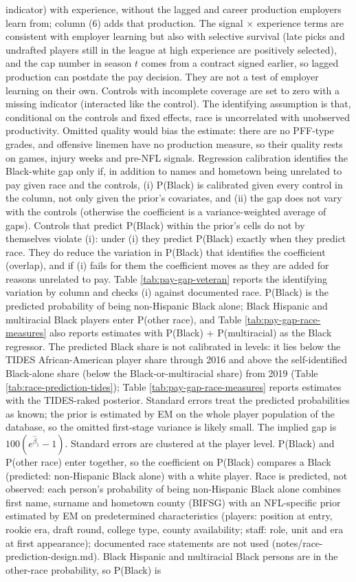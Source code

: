 {indicator) with experience, without the lagged and career production employers learn from; column (6) adds that production. The signal $\times$ experience terms are consistent with employer learning but also with selective survival (late picks and undrafted players still in the league at high experience are positively selected), and the cap number in season $t$ comes from a contract signed earlier, so lagged production can postdate the pay decision. They are not a test of employer learning on their own. Controls with incomplete coverage are set to zero with a missing indicator (interacted like the control). The identifying assumption is that, conditional on the controls and fixed effects, race is uncorrelated with unobserved productivity. Omitted quality would bias the estimate: there are no PFF-type grades, and offensive linemen have no production measure, so their quality rests on games, injury weeks and pre-NFL signals. Regression calibration identifies the Black-white gap only if, in addition to names and hometown being unrelated to pay given race and the controls, (i) P(Black) is calibrated given every control in the column, not only given the prior's covariates, and (ii) the gap does not vary with the controls (otherwise the coefficient is a variance-weighted average of gaps). Controls that predict P(Black) within the prior's cells do not by themselves violate (i): under (i) they predict P(Black) exactly when they predict race. They do reduce the variation in P(Black) that identifies the coefficient (overlap), and if (i) fails for them the coefficient moves as they are added for reasons unrelated to pay. Table \ref{tab:pay-gap-veteran} reports the identifying variation by column and checks (i) against documented race. P(Black) is the predicted probability of being non-Hispanic Black alone; Black Hispanic and multiracial Black players enter P(other race), and Table \ref{tab:pay-gap-race-measures} also reports estimates with P(Black) + P(multiracial) as the Black regressor. The predicted Black share is not calibrated in levels: it lies below the TIDES African-American player share through 2016 and above the self-identified Black-alone share (below the Black-or-multiracial share) from 2019 (Table \ref{tab:race-prediction-tides}); Table \ref{tab:pay-gap-race-measures} reports estimates with the TIDES-raked posterior. Standard errors treat the predicted probabilities as known; the prior is estimated by EM on the whole player population of the database, so the omitted first-stage variance is likely small. The implied gap is $100(e^{\hat\beta_1}-1)$. Standard errors are clustered at the player level. P(Black) and P(other race) enter together, so the coefficient on P(Black) compares a Black (predicted: non-Hispanic Black alone) with a white player. Race is predicted, not observed: each person's probability of being non-Hispanic Black alone combines first name, surname and hometown county (BIFSG) with an NFL-specific prior estimated by EM on predetermined characteristics (players: position at entry, rookie era, draft round, college type, county availability; staff: role, unit and era at first appearance); documented race statements are not used (notes/race-prediction-design.md). Black Hispanic and multiracial Black persons are in the other-race probability, so P(Black) is }
